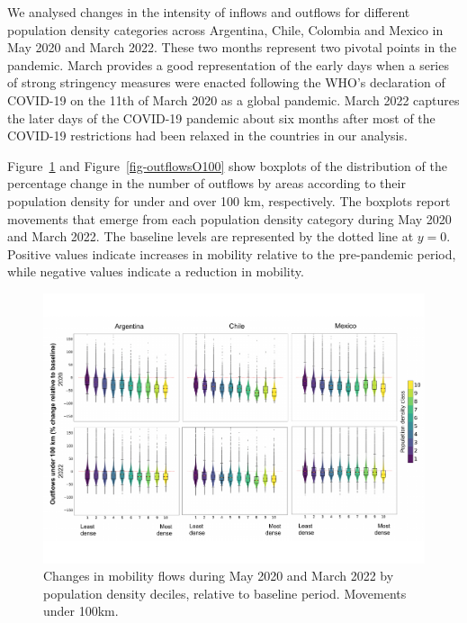 \documentclass[
  10pt,
  letterpaper,
  DIV=11,
  numbers=noendperiod]{scrartcl}
\begin{document}
We analysed changes in the intensity of inflows and outflows for
different population density categories across Argentina, Chile,
Colombia and Mexico in May 2020 and March 2022. These two months
represent two pivotal points in the pandemic. March provides a good
representation of the early days when a series of strong stringency
measures were enacted following the WHO's declaration of COVID-19 on the
11th of March 2020 as a global pandemic. March 2022 captures the later
days of the COVID-19 pandemic about six months after most of the
COVID-19 restrictions had been relaxed in the countries in our analysis.

Figure~\ref{fig-outflowsU100} and Figure~\ref{fig-outflowsO100} show
boxplots of the distribution of the percentage change in the number of
outflows by areas according to their population density for under and
over 100 km, respectively. The boxplots report movements that emerge
from each population density category during May 2020 and March 2022.
The baseline levels are represented by the dotted line at \(y=0\).
Positive values indicate increases in mobility relative to the
pre-pandemic period, while negative values indicate a reduction in
mobility.

\begin{figure}

{\centering \includegraphics{./outputs/all_countries_outflows_u100_minus_Colombia_lighter.pdf}

}

\caption{\label{fig-outflowsU100}Changes in mobility flows during May
2020 and March 2022 by population density deciles, relative to baseline
period. Movements under 100km.}

\end{figure}
\end{document}
